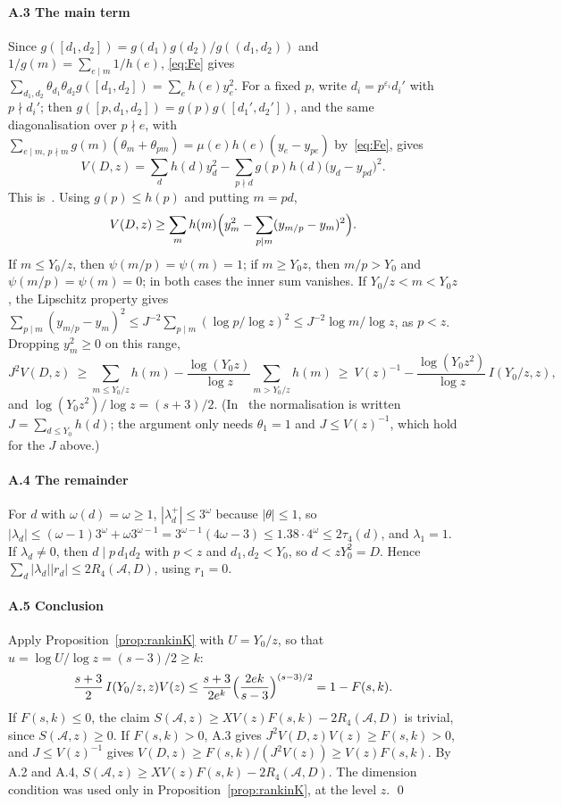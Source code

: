 \documentclass[preprint,11pt]{elsarticle}
\theoremstyle{definition}
\theoremstyle{remark}
\newcommand{\cA}{\mathcal{A}}
\numberwithin{equation}{section}
\begin{document}
\paragraph{A.3 The main term}
Since $g([d_1,d_2])=g(d_1)g(d_2)/g((d_1,d_2))$ and
$1/g(m)=\sum_{e\mid m}1/h(e)$, \eqref{eq:Fe} gives
$\sum_{d_1,d_2}\theta_{d_1}\theta_{d_2}g([d_1,d_2])=\sum_eh(e)y_e^2$. For a
fixed $p$, write $d_i=p^{\varepsilon_i}d_i'$ with $p\nmid d_i'$; then
$g([p,d_1,d_2])=g(p)g([d_1',d_2'])$, and the same diagonalisation over
$p\nmid e$, with $\sum_{e\mid m,\,p\nmid m}g(m)(\theta_m+\theta_{pm})
=\mu(e)h(e)(y_e-y_{pe})$ by~\eqref{eq:Fe}, gives
\begin{equation}\label{eq:VDz}
  V(D,z)=\sum_dh(d)y_d^2-\sum_{p\nmid d}g(p)h(d)\bigl(y_d-y_{pd}\bigr)^2 .
\end{equation}
This is~\cite[(2.3)]{Blight2010}. Using $g(p)\le h(p)$ and putting $m=pd$,
\[
  V(D,z)\ge\sum_mh(m)\Bigl(y_m^2-\sum_{p\mid m}(y_{m/p}-y_m)^2\Bigr).
\]
If $m\le Y_0/z$, then $\psi(m/p)=\psi(m)=1$; if $m\ge Y_0z$, then $m/p>Y_0$ and
$\psi(m/p)=\psi(m)=0$; in both cases the inner sum vanishes. If $Y_0/z<m<Y_0z$, the
Lipschitz property gives
$\sum_{p\mid m}(y_{m/p}-y_m)^2\le J^{-2}\sum_{p\mid m}(\log p/\log z)^2
\le J^{-2}\log m/\log z$, as $p<z$. Dropping $y_m^2\ge0$ on this range,
\[
  J^2V(D,z)\ \ge\sum_{m\le Y_0/z}h(m)-\frac{\log(Y_0z)}{\log z}\sum_{m>Y_0/z}h(m)
  \ \ge\ V(z)^{-1}-\frac{\log(Y_0z^2)}{\log z}\,I(Y_0/z,z),
\]
and $\log(Y_0z^2)/\log z=(s+3)/2$. (In~\cite[\S2.3]{Blight2010} the
normalisation is written $J=\sum_{d\le Y_0}h(d)$; the argument only needs
$\theta_1=1$ and $J\le V(z)^{-1}$, which hold for the $J$ above.)

\paragraph{A.4 The remainder}
For $d$ with $\omega(d)=\omega\ge1$, $|\lambda^+_d|\le3^{\omega}$ because
$|\theta|\le1$, so $|\lambda_d|\le(\omega-1)3^{\omega}+\omega3^{\omega-1}
=3^{\omega-1}(4\omega-3)\le1.38\cdot4^{\omega}\le2\tau_4(d)$, and
$\lambda_1=1$. If $\lambda_d\ne0$, then $d\mid p\,d_1d_2$ with $p<z$ and
$d_1,d_2<Y_0$, so $d<zY_0^2=D$. Hence $\sum_d|\lambda_d||r_d|\le2R_4(\cA,D)$,
using $r_1=0$.

\paragraph{A.5 Conclusion}
Apply Proposition~\ref{prop:rankinK} with $U=Y_0/z$, so that
$u=\log U/\log z=(s-3)/2\ge k$:
\[
  \frac{s+3}{2}\,I(Y_0/z,z)V(z)\le\frac{s+3}{2e^{k}}
  \Bigl(\frac{2ek}{s-3}\Bigr)^{(s-3)/2}=1-F(s,k).
\]
If $F(s,k)\le0$, the claim $S(\cA,z)\ge XV(z)F(s,k)-2R_4(\cA,D)$ is
trivial, since $S(\cA,z)\ge0$. If $F(s,k)>0$, A.3 gives
$J^2V(D,z)V(z)\ge F(s,k)>0$, and $J\le V(z)^{-1}$ gives
$V(D,z)\ge F(s,k)/(J^2V(z))\ge V(z)F(s,k)$. By A.2 and A.4,
$S(\cA,z)\ge XV(z)F(s,k)-2R_4(\cA,D)$. The dimension condition was used
only in Proposition~\ref{prop:rankinK}, at the level $z$. \qed
\end{document}
